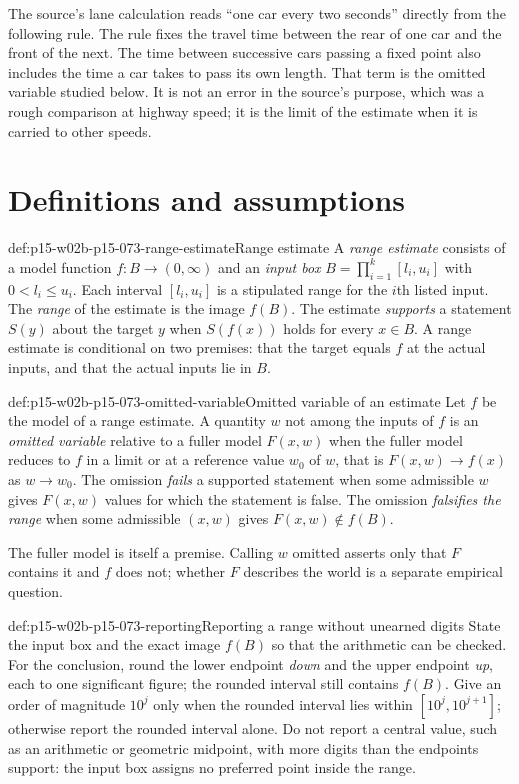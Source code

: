 The source's lane calculation reads ``one car every two seconds'' directly
from the following rule. The rule fixes the travel time between the rear of
one car and the front of the next. The time between successive cars passing
a fixed point also includes the time a car takes to pass its own length.
That term is the omitted variable studied below. It is not an error in the
source's purpose, which was a rough comparison at highway speed; it is the
limit of the estimate when it is carried to other speeds.

\section{Definitions and assumptions}
\label{sec:p15-w02b-p15-073-definitions}

\begin{hbdefinition}{def:p15-w02b-p15-073-range-estimate}{Range estimate}
A \emph{range estimate} consists of a model function
\(f:B\to(0,\infty)\) and an \emph{input box}
\(B=\prod_{i=1}^k[l_i,u_i]\) with \(0<l_i\leq u_i\).
Each interval \([l_i,u_i]\) is a stipulated range for the \(i\)th listed
input. The \emph{range} of the estimate is the image \(f(B)\).
The estimate \emph{supports} a statement \(S(y)\) about the target \(y\)
when \(S(f(x))\) holds for every \(x\in B\).
A range estimate is conditional on two premises: that the target equals
\(f\) at the actual inputs, and that the actual inputs lie in \(B\).
\end{hbdefinition}

\begin{hbdefinition}{def:p15-w02b-p15-073-omitted-variable}{Omitted variable of an estimate}
Let \(f\) be the model of a range estimate. A quantity \(w\) not among the
inputs of \(f\) is an \emph{omitted variable} relative to a fuller model
\(F(x,w)\) when the fuller model reduces to \(f\) in a limit or at a reference
value \(w_0\) of \(w\), that is \(F(x,w)\to f(x)\) as \(w\to w_0\).
The omission \emph{fails} a supported statement when some admissible
\(w\) gives \(F(x,w)\) values for which the statement is false.
The omission \emph{falsifies the range} when some admissible \((x,w)\)
gives \(F(x,w)\notin f(B)\).
\end{hbdefinition}

The fuller model is itself a premise. Calling \(w\) omitted asserts only that
\(F\) contains it and \(f\) does not; whether \(F\) describes the world is a
separate empirical question.

\begin{hbconvention}{def:p15-w02b-p15-073-reporting}{Reporting a range without unearned digits}
State the input box and the exact image \(f(B)\) so that the arithmetic can
be checked. For the conclusion, round the lower endpoint \emph{down} and the
upper endpoint \emph{up}, each to one significant figure; the rounded
interval still contains \(f(B)\). Give an order of magnitude \(10^j\) only
when the rounded interval lies within \([10^j,10^{j+1}]\); otherwise report
the rounded interval alone. Do not report a central value, such as an
arithmetic or geometric midpoint, with more digits than the endpoints
support: the input box assigns no preferred point inside the range.
\end{hbconvention}

